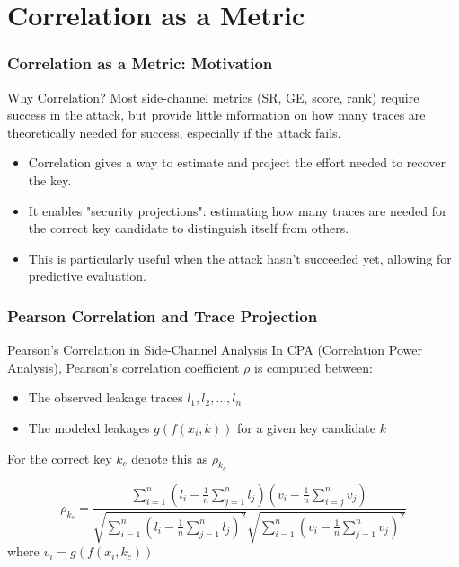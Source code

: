 \section{Correlation as a Metric}

\begin{frame}
    \frametitle{Correlation as a Metric: Motivation}

    \begin{block}{Why Correlation?}
        Most side-channel metrics (SR, GE, score, rank) require success in the attack, but provide little information on how many traces are theoretically needed for success, especially if the attack fails.
    \end{block}
    \begin{itemize}
        \item Correlation gives a way to estimate and project the effort needed to recover the key.
        \item It enables "security projections": estimating how many traces are needed for the correct key candidate to distinguish itself from others.
        \item This is particularly useful when the attack hasn't succeeded yet, allowing for predictive evaluation.
    \end{itemize}
\end{frame}

\begin{frame}
    \frametitle{Pearson Correlation and Trace Projection}

    \begin{block}{Pearson's Correlation in Side-Channel Analysis}
        In CPA (Correlation Power Analysis), Pearson's correlation coefficient $\rho$ is computed between:
        \begin{itemize}
            \item The observed leakage traces $l_1,l_2,\dots,l_n$
            \item The modeled leakages $g(f(x_i,k))$ for a given key candidate $k$
        \end{itemize}
        For the correct key $k_c$ denote this as $\rho_{k_c}$
    \end{block}
    $$ 
    \rho_{k_c} = \frac{
        \sum_{i=1}^n (l_i - \frac{1}{n}\sum_{j=1}^{n}l_j)
        (v_i - \frac{1}{n}\sum_{i=j}^{n}v_j)
     }{
        \sqrt{\sum_{i=1}^n (l_i - \frac{1}{n}\sum_{j=1}^{n}l_j)^2}
        \sqrt{\sum_{i=1}^n (v_i - \frac{1}{n}\sum_{j=1}^{n}v_j)^2}
     }
     $$
     \scriptsize where $v_i = g(f(x_i,k_c))$
\end{frame}



